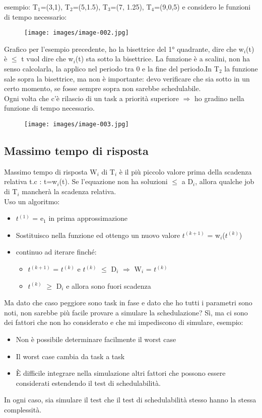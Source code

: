 \documentclass[12pt, oneside]{extbook}
\begin{document}
esempio: T$_{1}$=(3,1), T$_{2}$=(5,1.5), T$_{3}$=(7, 1.25), T$_{4}$=(9,0,5) e considero le funzioni di tempo necessario:\\
\begin{figure}[!h]
\centering
\texttt{[image: images/image-002.jpg]}
\end{figure}
Grafico per l'esempio precedente, ho la bisettrice del 1° quadrante, dire che w$_{i}$(t) è $\leq$ t vuol dire che w$_{i}$(t) sta sotto la bisettrice. La funzione è a scalini, non ha senso calcolarla, la applico nel periodo tra 0 e la fine del periodo.In T$_{2}$ la funzione sale sopra la bisettrice, ma non è importante: devo verificare che sia sotto in un certo momento, se fosse sempre sopra non sarebbe schedulabile.\\ Ogni volta che c'è rilascio di un task a priorità superiore $\Rightarrow$ ho gradino nella funzione di tempo necessario.\\
\begin{figure}[!h]
\centering
\texttt{[image: images/image-003.jpg]}
\end{figure}
\subsection{Massimo tempo di risposta}
Massimo tempo di risposta W$_{i}$ di T$_{i}$ è il più piccolo valore prima della scadenza relativa t.c : t=w$_{i}$(t). Se l'equazione non ha soluzioni $\leq$ a D$_{i}$, allora qualche job di T$_{i}$ mancherà la scadenza relativa.\\ Uso un algoritmo:\\
\begin{itemize}
\item $t^(1)$ = e$_{1}$ in prima approssimazione
\item  Sostituisco nella funzione ed ottengo un nuovo valore $t^(k+1)$ = w$_{i}$($t^(k)$)
\item continuo ad iterare finché: 
\begin{itemize}
\item $t^(k+1)$ = $t^(k)$ e $t^(k)$ $\leq$ D$_{i}$ $\Rightarrow$ W$_{i}$ = $t^(k)$
\item $t^(k)$ $\geq$ D$_{i}$ e allora sono fuori scadenza
\end{itemize}
\end{itemize}
Ma dato che caso peggiore sono task in fase e dato che ho tutti i parametri sono noti, non sarebbe più facile provare a simulare la schedulazione? Sì, ma ci sono dei fattori che non ho considerato e che mi impediscono di simulare, esempio:
\begin{itemize}
\item Non è possibile determinare facilmente il worst case
\item Il worst case cambia da task a task
\item È difficile integrare nella simulazione altri fattori che possono essere considerati estendendo il test di schedulabilità.
\end{itemize}
In ogni caso, sia simulare il test che il test di schedulabilità stesso hanno la stessa complessità.
\end{document}
